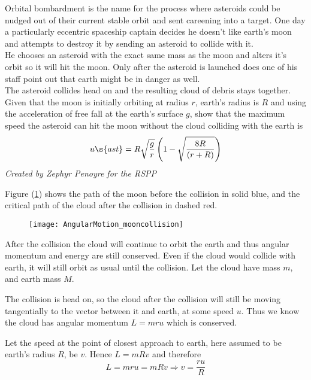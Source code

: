 \begin{problem}
{
Orbital bombardment is the name for the process where asteroids could be nudged out of their current stable orbit and sent careening into a target. One day a particularly eccentric spaceship captain decides he doesn't like earth's moon and attempts to destroy it by sending an asteroid to collide with it.
\\
\linebreak
  He chooses an asteroid with the exact same mass as the moon and alters it's orbit so it will hit the moon. Only after the asteroid is launched does one of his staff point out that earth might be in danger as well.
\\
\linebreak
 The asteroid collides head on and the resulting cloud of debris stays together. Given that the moon is initially orbiting at radius $r$, earth's radius is $R$ and using the acceleration of free fall at the earth's surface $g$, show that the maximum speed the asteroid can hit the moon without the cloud colliding with the earth is
 \begin{equation*}
 u\s{ast} = R \sqrt{\dfrac{g}{r}} \left(1 - \sqrt{\dfrac{8R}{(r + R)} } \right)
 \end{equation*}
}
{\textit{Created by Zephyr Penoyre for the RSPP}}
{Figure (\ref{fig:AngularMotion_mooncollision}) shows the path of the moon before the collision in solid blue, and the critical path of the cloud after the collision in dashed red.

\begin{figure}[h]
\centering
\texttt{[image: AngularMotion\_mooncollision]}
\caption{}
\label{fig:AngularMotion_mooncollision}
\end{figure}

After the collision the cloud will continue to orbit the earth and thus angular momentum and energy are still conserved. Even if the cloud would collide with earth, it will still orbit as usual until the collision. Let the cloud have mass $m$, and earth mass $M$.

 The collision is head on, so the cloud after the collision will still be moving tangentially to the vector between it and earth, at some speed $u$. Thus we know the cloud has angular momentum $L = mru$ which is conserved.

  Let the speed at the point of closest approach to earth, here assumed to be earth's radius $R$, be $v$. Hence $L = mRv$ and therefore 
  \begin{equation}
  L= mru = mRv \Rightarrow v = \dfrac{ru}{R}
  \label{angMom}
  \end{equation}
  
}
\end{problem}

